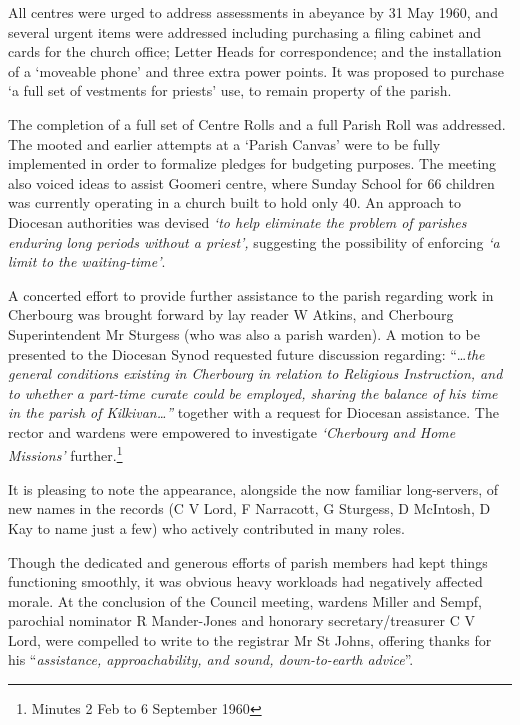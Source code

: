 All centres were urged to address assessments in abeyance by 31 May 1960, and several urgent items were addressed including purchasing a filing cabinet and cards for the church office; Letter Heads for correspondence; and the installation of a `moveable phone' and three extra power points. It was proposed to purchase `a full set of vestments for priests' use, to remain property of the parish.



The completion of a full set of Centre Rolls and a full Parish Roll was addressed. The mooted and earlier attempts at a `Parish Canvas' were to be fully implemented in order to formalize pledges for budgeting purposes. The meeting also voiced ideas to assist Goomeri centre, where Sunday School for 66 children was currently operating in a church built to hold only 40. An approach to Diocesan authorities was devised \emph{`to help eliminate the problem of parishes enduring long periods without a priest',} suggesting the possibility of enforcing \emph{`a limit to the waiting-time'}.



A concerted effort to provide further assistance to the parish regarding work in Cherbourg was brought forward by lay reader W Atkins, and Cherbourg Superintendent Mr Sturgess (who was also a parish warden). A motion to be presented to the Diocesan Synod requested future discussion regarding: ``\ldots{}\emph{the general conditions existing in Cherbourg in relation to Religious Instruction, and to whether a part-time curate could be employed, sharing the balance of his time in the parish of Kilkivan\ldots''} together with a request for Diocesan assistance. The rector and wardens were empowered to investigate \emph{`Cherbourg and Home Missions'} further.\footnote{Minutes 2 Feb to 6 September 1960}


It is pleasing to note the appearance, alongside the now familiar long-servers, of new names in the records (C V Lord, F Narracott, G Sturgess, D McIntosh, D Kay to name just a few) who actively contributed in many roles.



Though the dedicated and generous efforts of parish members had kept things functioning smoothly, it was obvious heavy workloads had negatively affected morale. At the conclusion of the Council meeting, wardens Miller and Sempf, parochial nominator R Mander-Jones and honorary secretary/treasurer C V Lord, were compelled to write to the registrar Mr St Johns, offering thanks for his ``\emph{assistance, approachability, and sound, down-to-earth advice}''.



